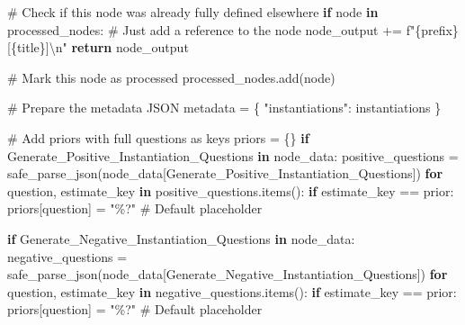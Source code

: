 \documentclass[
  11pt,
  letterpaper,
]{book}
\newenvironment{Shaded}{\begin{snugshade}}{\end{snugshade}}
\newcommand{\CharTok}[1]{\textcolor[rgb]{0.13,0.47,0.30}{#1}}
\newcommand{\CommentTok}[1]{\textcolor[rgb]{0.37,0.37,0.37}{#1}}
\newcommand{\ControlFlowTok}[1]{\textcolor[rgb]{0.00,0.23,0.31}{\textbf{#1}}}
\newcommand{\KeywordTok}[1]{\textcolor[rgb]{0.00,0.23,0.31}{\textbf{#1}}}
\newcommand{\NormalTok}[1]{\textcolor[rgb]{0.00,0.23,0.31}{#1}}
\newcommand{\OperatorTok}[1]{\textcolor[rgb]{0.37,0.37,0.37}{#1}}
\newcommand{\SpecialCharTok}[1]{\textcolor[rgb]{0.37,0.37,0.37}{#1}}
\newcommand{\SpecialStringTok}[1]{\textcolor[rgb]{0.13,0.47,0.30}{#1}}
\newcommand{\StringTok}[1]{\textcolor[rgb]{0.13,0.47,0.30}{#1}}
\begin{document}
\begin{Shaded}
\begin{Highlighting}[]
      \CommentTok{\# Check if this node was already fully defined elsewhere}
      \ControlFlowTok{if}\NormalTok{ node }\KeywordTok{in}\NormalTok{ processed\_nodes:}
          \CommentTok{\# Just add a reference to the node}
\NormalTok{          node\_output }\OperatorTok{+=} \SpecialStringTok{f"}\SpecialCharTok{\{}\NormalTok{prefix}\SpecialCharTok{\}}\SpecialStringTok{[}\SpecialCharTok{\{}\NormalTok{title}\SpecialCharTok{\}}\SpecialStringTok{]}\CharTok{\textbackslash{}n}\SpecialStringTok{"}
          \ControlFlowTok{return}\NormalTok{ node\_output}

      \CommentTok{\# Mark this node as processed}
\NormalTok{      processed\_nodes.add(node)}

      \CommentTok{\# Prepare the metadata JSON}
\NormalTok{      metadata }\OperatorTok{=}\NormalTok{ \{}
          \StringTok{"instantiations"}\NormalTok{: instantiations}
\NormalTok{      \}}

      \CommentTok{\# Add priors with full questions as keys}
\NormalTok{      priors }\OperatorTok{=}\NormalTok{ \{\}}
      \ControlFlowTok{if} \StringTok{\textquotesingle{}Generate\_Positive\_Instantiation\_Questions\textquotesingle{}} \KeywordTok{in}\NormalTok{ node\_data:}
\NormalTok{          positive\_questions }\OperatorTok{=}\NormalTok{ safe\_parse\_json(node\_data[}\StringTok{\textquotesingle{}Generate\_Positive\_Instantiation\_Questions\textquotesingle{}}\NormalTok{])}
          \ControlFlowTok{for}\NormalTok{ question, estimate\_key }\KeywordTok{in}\NormalTok{ positive\_questions.items():}
              \ControlFlowTok{if}\NormalTok{ estimate\_key }\OperatorTok{==} \StringTok{\textquotesingle{}prior\textquotesingle{}}\NormalTok{:}
\NormalTok{                  priors[question] }\OperatorTok{=} \StringTok{"\%?"}  \CommentTok{\# Default placeholder}

      \ControlFlowTok{if} \StringTok{\textquotesingle{}Generate\_Negative\_Instantiation\_Questions\textquotesingle{}} \KeywordTok{in}\NormalTok{ node\_data:}
\NormalTok{          negative\_questions }\OperatorTok{=}\NormalTok{ safe\_parse\_json(node\_data[}\StringTok{\textquotesingle{}Generate\_Negative\_Instantiation\_Questions\textquotesingle{}}\NormalTok{])}
          \ControlFlowTok{for}\NormalTok{ question, estimate\_key }\KeywordTok{in}\NormalTok{ negative\_questions.items():}
              \ControlFlowTok{if}\NormalTok{ estimate\_key }\OperatorTok{==} \StringTok{\textquotesingle{}prior\textquotesingle{}}\NormalTok{:}
\NormalTok{                  priors[question] }\OperatorTok{=} \StringTok{"\%?"}  \CommentTok{\# Default placeholder}


\end{Highlighting}
\end{Shaded}
\end{document}
